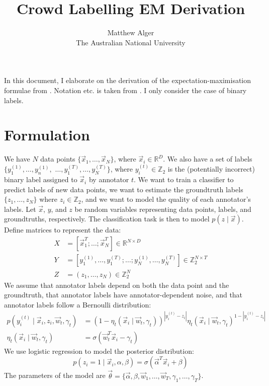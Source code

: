 \documentclass[a4paper]{article}
\begin{document}
    \title{Crowd Labelling EM Derivation}
    \author{Matthew Alger\\The Australian National University}
    \maketitle

    In this document, I elaborate on the derivation of the expectation-maximisation formulae from \citet{yan10}. Notation etc. is taken from \citet{yan10}. I only consider the case of binary labels.

    \section{Formulation}

        We have $N$ data points $\{\vec x_1, \dots, \vec x_N\}$, where $\vec x_i \in \mathbb{R}^D$. We also have a set of labels $\{y_1^{(1)}, \dots, y_n^{(1)},$ $\dots, y_1^{(T)}, \dots, y_N^{(T)}\}$, where $y_i^{(t)} \in \mathbb{Z}_2$ is the (potentially incorrect) binary label assigned to $\vec x_i$ by annotator $t$. We want to train a classifier to predict labels of new data points, we want to estimate the groundtruth labels $\{z_1, \dots, z_N\}$ where $z_i \in \mathbb{Z}_2$, and we want to model the quality of each annotator's labels. Let $\vec x$, $y$, and $z$ be random variables representing data points, labels, and groundtruths, respectively. The classification task is then to model $p(z \mid \vec x)$.
        Define matrices to represent the data:
        \begin{align*}
            X &= [\vec x_1^T; \dots; \vec x_N^T] \in \mathbb{R}^{N \times D}\\
            Y &= [y_1^{(1)}, \dots, y_1^{(T)}; \dots; y_N^{(1)}, \dots, y_N^{(T)}] \in \mathbb{Z}_2^{N \times T}\\
            Z &= (z_1, \dots, z_N) \in \mathbb{Z}_2^N
        \end{align*}
        We assume that annotator labels depend on both the data point and the groundtruth, that annotator labels have annotator-dependent noise, and that annotator labels follow a Bernoulli distribution:
        \begin{align*}
            p(y_i^{(t)} \mid \vec x_i, z_i, \vec w_t, \gamma_t) &= (1 - \eta_t(\vec x_i \mid \vec w_t, \gamma_t))^{|y_i^{(t)} - z_i|} \eta_t(\vec x_i \mid \vec w_t, \gamma_t)^{1 - |y_i^{(t)} - z_i|}\\
            \eta_t(\vec x_i \mid \vec w_t, \gamma_t) &= \sigma(\vec w_t^T \vec x_i - \gamma_t)
        \end{align*}
        We use logistic regression to model the posterior distribution:
        \[
            p(z_i = 1 \mid \vec x_i, \alpha, \beta) = \sigma(\vec \alpha^T \vec x_i + \beta)
        \]
        The parameters of the model are $\vec \theta = \{\vec \alpha, \beta, \vec w_1, \dots, \vec w_T, \gamma_1, \dots, \gamma_T\}$.
\end{document}
